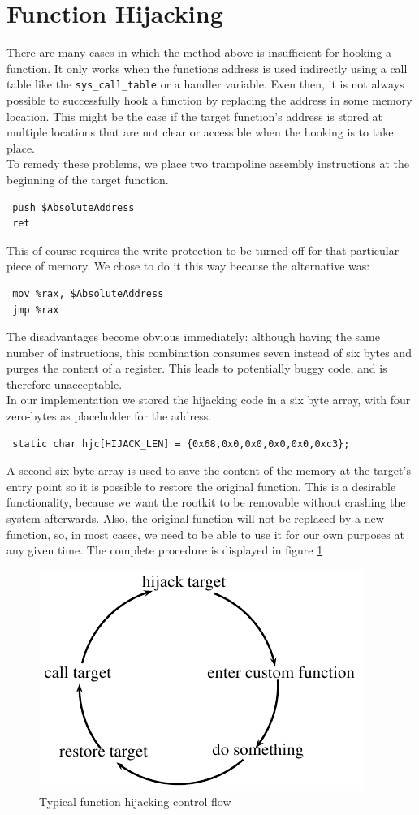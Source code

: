 \section{Function Hijacking}
\label{sec:hij}
There are many cases in which the method above is insufficient for hooking a 
function. It only works when the functions address is used indirectly using a 
call table like the \verb+sys_call_table+ or a handler variable. Even then, it 
is not always possible to successfully hook a function by replacing the address 
in some memory location. This might be the case if the target function's 
address is stored at multiple locations that are not clear or accessible when 
the hooking is to take place.\\
To remedy these problems, we place two trampoline assembly instructions at the 
beginning of the target function.
\lstset{style=customasm}
\begin{lstlisting}
 push $AbsoluteAddress
 ret
\end{lstlisting}
This of course requires the write protection to be turned off for that 
particular piece of memory. We chose to do it this way because the alternative 
was:
\begin{lstlisting}
 mov %rax, $AbsoluteAddress
 jmp %rax
\end{lstlisting}
The disadvantages become obvious immediately: although having the same number 
of instructions, this combination consumes seven instead of six bytes and 
purges the content of a register. This leads to potentially 
buggy code, and is therefore unacceptable.\newline
\hfill\\
In our implementation we stored the hijacking code in a six byte array, with 
four zero-bytes as placeholder for the address.
\lstset{style=customc}
\begin{lstlisting}
 static char hjc[HIJACK_LEN] = {0x68,0x0,0x0,0x0,0x0,0xc3};
\end{lstlisting}
A second six byte array is used to save the content of the memory at the 
target's entry point so it is possible to restore the original function.
This is a desirable functionality, because we want the rootkit to be removable 
without crashing the system afterwards. Also, the original function will not be 
replaced by a new function, so, in most cases, we need to be able to use it for 
our own purposes at any given time. The complete procedure is displayed in figure \ref{fig:control}\par
\begin{figure}
\centering
 \includegraphics{control_flow}
 \caption{Typical function hijacking control flow}
 \label{fig:control}
\end{figure}
